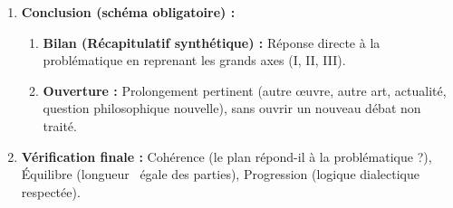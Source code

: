\documentclass[11pt]{article}
\begin{document}
\begin{methode}
\begin{enumerate}
        \item \textbf{Conclusion (schéma obligatoire) :}
            \begin{enumerate}
                \item \textbf{Bilan (Récapitulatif synthétique) :} Réponse directe à la problématique en reprenant les grands axes (I, II, III).
                \item \textbf{Ouverture :} Prolongement pertinent (autre œuvre, autre art, actualité, question philosophique nouvelle), sans ouvrir un nouveau débat non traité.
            \end{enumerate}
        \item \textbf{Vérification finale :} Cohérence (le plan répond-il à la problématique ?), Équilibre (longueur ~égale des parties), Progression (logique dialectique respectée).
    \end{enumerate}
\end{methode}
\end{document}
